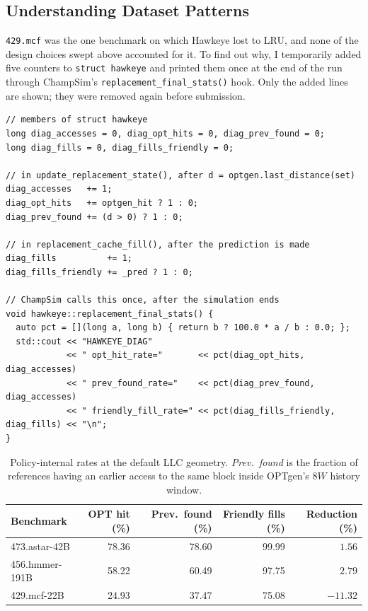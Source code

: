 \documentclass[11pt]{article}
\begin{document}
\subsection{Understanding Dataset Patterns} \label{sec:dataset_patterns}

\texttt{429.mcf} was the one benchmark on which Hawkeye lost to LRU, and none of the design choices swept above accounted for it. To find out why, I temporarily added five counters to \texttt{struct hawkeye} and printed them once at the end of the run through ChampSim's \texttt{replacement\_final\_stats()} hook. Only the added lines are shown;
they were removed again before submission.

\begin{lstlisting}[style=cpp,caption={Counters added to \texttt{hawkeye} (additions only).},label=lst:diag]
// members of struct hawkeye
long diag_accesses = 0, diag_opt_hits = 0, diag_prev_found = 0;
long diag_fills = 0, diag_fills_friendly = 0;

// in update_replacement_state(), after d = optgen.last_distance(set)
diag_accesses   += 1;
diag_opt_hits   += optgen_hit ? 1 : 0;
diag_prev_found += (d > 0) ? 1 : 0;

// in replacement_cache_fill(), after the prediction is made
diag_fills          += 1;
diag_fills_friendly += _pred ? 1 : 0;

// ChampSim calls this once, after the simulation ends
void hawkeye::replacement_final_stats() {
  auto pct = [](long a, long b) { return b ? 100.0 * a / b : 0.0; };
  std::cout << "HAWKEYE_DIAG"
            << " opt_hit_rate="       << pct(diag_opt_hits,      diag_accesses)
            << " prev_found_rate="    << pct(diag_prev_found,    diag_accesses)
            << " friendly_fill_rate=" << pct(diag_fills_friendly, diag_fills) << "\n";
}
\end{lstlisting}

\begin{table}[H]
\centering\small
\begin{tabular}{lrrrr}
\toprule
Benchmark & OPT hit (\%) & Prev.\ found (\%) & Friendly fills (\%) & Reduction (\%) \\
\midrule
473.astar-42B  & 78.36 & 78.60 & 99.99 & $1.56$    \\
456.hmmer-191B & 58.22 & 60.49 & 97.75 & $2.79$    \\
429.mcf-22B    & 24.93 & 37.47 & 75.08 & $-11.32$  \\
\bottomrule
\end{tabular}
\caption{Policy-internal rates at the default LLC geometry. \emph{Prev.\ found} is the
fraction of references having an earlier access to the same block inside OPTgen's $8W$
history window.}
\label{tab:diag}
\end{table}
\end{document}
